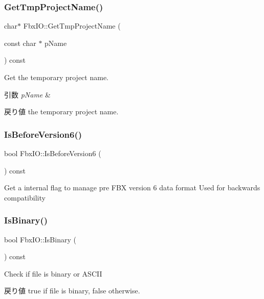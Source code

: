 \subsubsection{\texorpdfstring{Get\+Tmp\+Project\+Name()}{GetTmpProjectName()}}
{\footnotesize\ttfamily char$\ast$ Fbx\+I\+O\+::\+Get\+Tmp\+Project\+Name (\begin{DoxyParamCaption}\item[{const char $\ast$}]{p\+Name }\end{DoxyParamCaption}) const}

Get the temporary project name. 
\begin{DoxyParams}{引数}
{\em p\+Name} & \\
\hline
\end{DoxyParams}
\begin{DoxyReturn}{戻り値}
the temporary project name. 
\end{DoxyReturn}
\mbox{\label{class_fbx_i_o_aeedbe8302295c34608a1b55b8c50c09e}} 
\subsubsection{\texorpdfstring{Is\+Before\+Version6()}{IsBeforeVersion6()}}
{\footnotesize\ttfamily bool Fbx\+I\+O\+::\+Is\+Before\+Version6 (\begin{DoxyParamCaption}{ }\end{DoxyParamCaption}) const}

Get a internal flag to manage pre F\+BX version 6 data format Used for backwards compatibility \mbox{\label{class_fbx_i_o_abbc12089fd9865a4e570e4ee6b4bab4a}} 
\subsubsection{\texorpdfstring{Is\+Binary()}{IsBinary()}}
{\footnotesize\ttfamily bool Fbx\+I\+O\+::\+Is\+Binary (\begin{DoxyParamCaption}{ }\end{DoxyParamCaption}) const}

Check if file is binary or A\+S\+C\+II \begin{DoxyReturn}{戻り値}
{\ttfamily true} if file is binary, false otherwise. 
\end{DoxyReturn}
\mbox{\label{class_fbx_i_o_aa9ad1b3f82deb8bc555c2469d9ea79d9}} 
